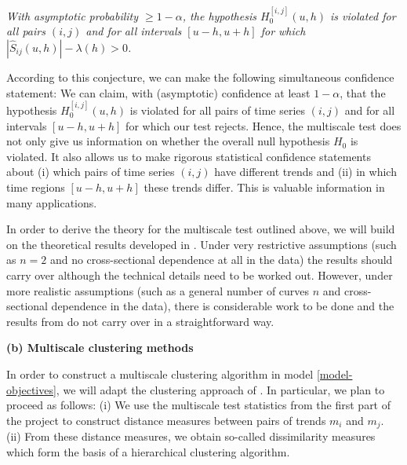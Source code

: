 \documentclass[a4paper,12pt]{article}
\begin{document}
\begin{enumerate}[label=(\roman*),leftmargin=0.75cm]
\textit{With asymptotic probability $\ge 1-\alpha$, the hypothesis $H_0^{[i,j]}(u,h)$ is violated for all pairs $(i,j)$ and for all intervals $[u-h,u+h]$ for which $|\hat{S}_{ij}(u,h)| - \lambda(h) > 0$.} 

According to this conjecture, we can make the following simultaneous confidence statement: We can claim, with (asymptotic) confidence at least $1-\alpha$, that the hypothesis $H_0^{[i,j]}(u,h)$ is violated for all pairs of time series $(i,j)$ and for all intervals $[u-h,u+h]$ for which our test rejects. Hence, the multiscale test does not only give us information on whether the overall null hypothesis $H_0$ is violated. It also allows us to make rigorous statistical confidence statements about (i) which pairs of time series $(i,j)$ have different trends and (ii) in which time regions $[u-h,u+h]$ these trends differ. This is valuable information in many applications. 

\end{enumerate}
In order to derive the theory for the multiscale test outlined above, we will build on the theoretical results developed in \cite{KhismatullinaVogt2018}. Under very restrictive assumptions (such as $n=2$ and no cross-sectional dependence at all in the data) the results should carry over although the technical details need to be worked out. However, under more realistic assumptions (such as a general number of curves $n$ and cross-sectional dependence in the data), there is considerable work to be done and the results from \cite{KhismatullinaVogt2018} do not carry over in a straightforward way. 
\vspace{10pt}


\noindent \textbf{(b) Multiscale clustering methods} 
\vspace{10pt} 


\noindent In order to construct a multiscale clustering algorithm in model \eqref{model-objectives}, we will adapt the clustering approach of \cite{VogtLinton2018}. In particular, we plan to proceed as follows: (i) We use the multiscale test statistics from the first part of the project to construct distance measures between pairs of trends $m_i$ and $m_j$. (ii) From these distance measures, we obtain so-called dissimilarity measures which form the basis of a hierarchical clustering algorithm. 
\end{document}
